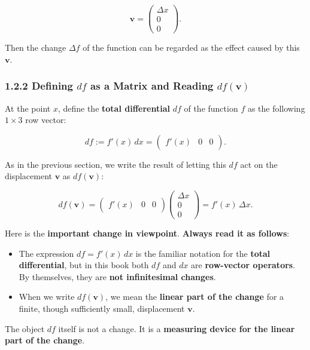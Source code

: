 \[
\mathbf{v}=\begin{pmatrix}\Delta x\\0\\0\end{pmatrix}.
\]

Then the change \(\Delta f\) of the function can be regarded as the
effect caused by this \(\mathbf{v}\).

\hypertarget{defining-df-as-a-matrix-and-reading-dfmathbfv}{%
\subsubsection{\texorpdfstring{1.2.2 Defining \(df\) as a Matrix and
Reading
\(df(\mathbf{v})\)}{1.2.2 Defining df as a Matrix and Reading df(\textbackslash mathbf\{v\})}}\label{defining-df-as-a-matrix-and-reading-dfmathbfv}}

At the point \(x\), define the \textbf{total differential} \(df\) of the
function \(f\) as the following \(1\times3\) row vector:

\[
df:=f'(x)\,dx=\begin{pmatrix}f'(x)&0&0\end{pmatrix}.
\]

As in the previous section, we write the result of letting this \(df\)
act on the displacement \(\mathbf{v}\) as \(df(\mathbf{v})\):

\[
df(\mathbf{v})=
\begin{pmatrix}f'(x)&0&0\end{pmatrix}
\begin{pmatrix}\Delta x\\0\\0\end{pmatrix}
=f'(x)\,\Delta x.
\]

Here is the \textbf{important change in viewpoint}.
\textbf{Always read it as follows}:

\begin{itemize}
\item
  The expression \(df=f'(x)\,dx\) is the familiar notation for the
  \textbf{total differential}, but in this book both \(df\) and \(dx\)
  are \textbf{row-vector operators}. By themselves, they are
  \textbf{not infinitesimal changes}.
\item
  When we write \(df(\mathbf{v})\), we mean the
  \textbf{linear part of the change} for a finite, though sufficiently
  small, displacement \(\mathbf{v}\).
\end{itemize}

The object \(df\) itself is not a change. It is a
\textbf{measuring device for the linear part of the change}.

